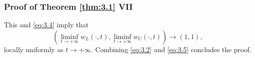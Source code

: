 
\begin{frame}
    \frametitle{Proof of Theorem \ref{thm:3.1} VII}
    \begin{proofe}
        This and \eqref{eq:3.4} imply that
        \begin{equation}
            (\liminf_{t \to +\infty} w_L(\cdot, t), \liminf_{t \to +\infty} w_U(\cdot, t)) \to (1, 1),
            \label{eq:3.5}
        \end{equation}
        locally uniformly as \(t \to +\infty\).
        Combining \eqref{eq:3.2} and \eqref{eq:3.5} concludes the proof.
    \end{proofe}
\end{frame}
        